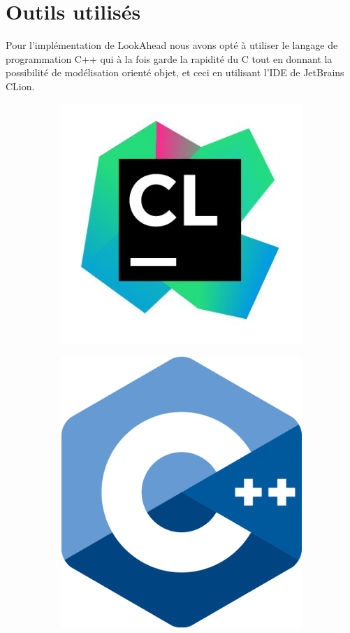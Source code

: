 \documentclass[12pt]{report}
\begin{document}
\section{Outils utilisés}
Pour l’implémentation de LookAhead nous avons opté à utiliser le langage de programmation C++ qui à la fois garde la rapidité du C tout en donnant la possibilité de modélisation orienté objet, et ceci en utilisant l'IDE de JetBrains CLion.
\begin{figure}[H]
	\centering
	\begin{subfigure}{.5\textwidth}
		\centering
		\includegraphics[scale=0.3]{imgs/Clion.jpg}
		\label{fig:sub1}
	\end{subfigure}%
	\begin{subfigure}{.5\textwidth}
		\centering
		\includegraphics[scale=0.08]{imgs/C++.png}
		\label{fig:sub2}
	\end{subfigure}
	\label{fig:test}
\end{figure}
\end{document}

